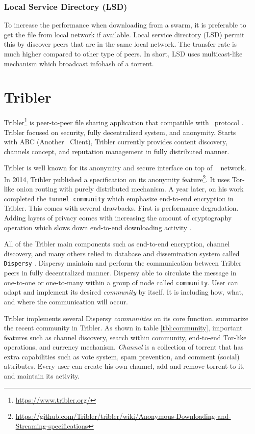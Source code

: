 \subsubsection{Local Service Directory (LSD)}
To increase the performance when downloading from a swarm, it is preferable to get the file from local network if available. Local service directory (LSD) permit this by discover peers that are in the same local network. The transfer rate is much higher compared to other type of peers. In short, LSD uses multicast-like mechanism which broadcast infohash of a torrent.

\section{Tribler}
Tribler\footnote{\url{https://www.tribler.org/}} is peer-to-peer file sharing application that compatible with \bt~protocol \cite{2008:tribler:pouwelse}. Tribler focused on security, fully decentralized system, and anonymity. Starts with ABC (Another \bt~Client), Tribler currently provides content discovery, channels concept, and reputation management in fully distributed manner.

Tribler is well known for its anonymity and secure interface on top of \bt~ network. In 2014, Tribler published a specification on its anonymity feature\footnote{\url{https://github.com/Tribler/tribler/wiki/Anonymous-Downloading-and-Streaming-specifications}}. It uses Tor-like onion routing with purely distributed mechanism. A year later, \citeauthor{2015:tunnel:ruigrok} on his work completed the \texttt{tunnel community} which emphasize end-to-end encryption in Tribler. This comes with several drawbacks. First is performance degradation. Adding layers of privacy comes with increasing the amount of cryptography operation which slows down end-to-end downloading activity \cite{2015:tunnel:ruigrok}.

All of the Tribler main components such as end-to-end encryption, channel discovery, and many others relied in database and dissemination system called \texttt{Dispersy} \cite{2013:dispersy:zeilemaker}. Dispersy maintain and perform the communication between Tribler peers in fully decentralized manner. Dispersy able to circulate the message in one-to-one or one-to-many within a group of node called \texttt{community}. User can adapt and implement its desired \textit{community} by itself. It is including how, what, and where the communication will occur.

Tribler implements several Dispersy \textit{communities} on its core function. \citeauthor{2016:tribler-techdebt:vos} summarize the recent community in Tribler. As shown in table \ref{tbl:community}, important features such as channel discovery, search within community, end-to-end Tor-like operations, and currency mechanism. \textit{Channel} is a collection of torrent that has extra capabilities such as vote system, spam prevention, and comment (social) attributes. Every user can create his own channel, add and remove torrent to it, and maintain its activity.

